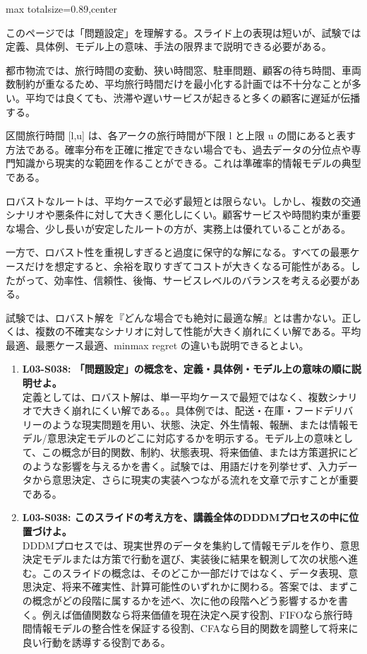 \begin{minipage}[t]{0.58\textwidth}
\begin{adjustbox}{max totalsize={\textwidth}{0.89\textheight},center}
\begin{minipage}{\textwidth}\scriptsize
{}このページでは「問題設定」を理解する。スライド上の表現は短いが、試験では定義、具体例、モデル上の意味、手法の限界まで説明できる必要がある。\par
都市物流では、旅行時間の変動、狭い時間窓、駐車問題、顧客の待ち時間、車両数制約が重なるため、平均旅行時間だけを最小化する計画では不十分なことが多い。平均では良くても、渋滞や遅いサービスが起きると多くの顧客に遅延が伝播する。\par
区間旅行時間 [l,u] は、各アークの旅行時間が下限 l と上限 u の間にあると表す方法である。確率分布を正確に推定できない場合でも、過去データの分位点や専門知識から現実的な範囲を作ることができる。これは準確率的情報モデルの典型である。\par
ロバストなルートは、平均ケースで必ず最短とは限らない。しかし、複数の交通シナリオや悪条件に対して大きく悪化しにくい。顧客サービスや時間約束が重要な場合、少し長いが安定したルートの方が、実務上は優れていることがある。\par
一方で、ロバスト性を重視しすぎると過度に保守的な解になる。すべての最悪ケースだけを想定すると、余裕を取りすぎてコストが大きくなる可能性がある。したがって、効率性、信頼性、後悔、サービスレベルのバランスを考える必要がある。\par
試験では、ロバスト解を『どんな場合でも絶対に最適な解』とは書かない。正しくは、複数の不確実なシナリオに対して性能が大きく崩れにくい解である。平均最適、最悪ケース最適、minmax regret の違いも説明できるとよい。\par{}\begin{enumerate}\item \textbf{L03-S038: 「問題設定」の概念を、定義・具体例・モデル上の意味の順に説明せよ。}\\定義としては、ロバスト解は、単一平均ケースで最短ではなく、複数シナリオで大きく崩れにくい解である。。具体例では、配送・在庫・フードデリバリーのような現実問題を用い、状態、決定、外生情報、報酬、または情報モデル/意思決定モデルのどこに対応するかを明示する。モデル上の意味として、この概念が目的関数、制約、状態表現、将来価値、または方策選択にどのような影響を与えるかを書く。試験では、用語だけを列挙せず、入力データから意思決定、さらに現実の実装へつながる流れを文章で示すことが重要である。\item \textbf{L03-S038: このスライドの考え方を、講義全体のDDDMプロセスの中に位置づけよ。}\\DDDMプロセスでは、現実世界のデータを集約して情報モデルを作り、意思決定モデルまたは方策で行動を選び、実装後に結果を観測して次の状態へ進む。このスライドの概念は、そのどこか一部だけではなく、データ表現、意思決定、将来不確実性、計算可能性のいずれかに関わる。答案では、まずこの概念がどの段階に属するかを述べ、次に他の段階へどう影響するかを書く。例えば価値関数なら将来価値を現在決定へ戻す役割、FIFOなら旅行時間情報モデルの整合性を保証する役割、CFAなら目的関数を調整して将来に良い行動を誘導する役割である。\end{enumerate}

\end{minipage}
\end{adjustbox}
\end{minipage}
